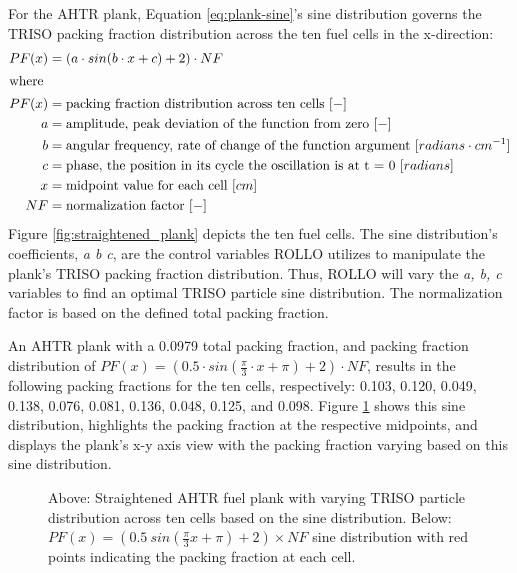 For the \gls{AHTR} plank, Equation \ref{eq:plank-sine}'s sine distribution governs 
the \gls{TRISO} packing fraction distribution across the ten fuel cells in the 
x-direction:
\begin{align}
    \label{eq:plank-sine}
    PF(x) &= \left(a\cdot sin(b\cdot x + c) + 2\right) \cdot NF\\
    \intertext{where}
    PF(x) &= \mbox{packing fraction distribution across ten cells } [-] \nonumber \\ 
    a &= \mbox{amplitude, peak deviation of the function from zero } [-] \nonumber \\
    b &= \mbox{angular frequency, rate of change of the function argument } [radians \cdot cm^{-1}] \nonumber \\
    c &= \mbox{phase, the position in its cycle the oscillation is at t = 0 } [radians]\nonumber \\
    x &= \mbox{midpoint value for each cell } [cm]\nonumber \\
    NF &= \mbox{normalization factor } [-]\nonumber
\end{align}
Figure \ref{fig:straightened_plank} depicts the ten fuel cells.
The sine distribution's coefficients, \textit{a b c}, are the control variables 
\gls{ROLLO} utilizes to manipulate the plank's TRISO packing fraction distribution.
Thus, \gls{ROLLO} will vary the \textit{a, b, c} variables to find an optimal 
TRISO particle sine distribution. 
The normalization factor is based on the defined total packing fraction.

An \gls{AHTR} plank with a 0.0979 total packing fraction, and packing fraction 
distribution of $PF(x) = \left(0.5\cdot sin(\frac{\pi}{3}\cdot x + \pi) + 2\right) 
\cdot NF$, results in the following packing fractions for the ten cells, respectively: 
0.103, 0.120, 0.049, 0.138, 0.076, 0.081, 0.136, 0.048, 0.125, and 0.098. 
Figure \ref{fig:triso_distribution} shows this sine distribution, highlights 
the packing fraction at the respective midpoints, and displays the plank's x-y 
axis view with the packing fraction varying based on this sine distribution. 
\begin{figure}[htbp]
    \centering
    \caption{Above: Straightened \acrfull{AHTR} fuel plank with varying \gls{TRISO} particle 
    distribution across ten cells based on the sine distribution. 
    Below: $PF(x) = (0.5\ sin(\frac{\pi}{3}x + \pi) + 2)  \times NF$ 
    sine distribution with red points indicating the packing fraction at each cell.}
    \label{fig:triso_distribution}
\end{figure}

